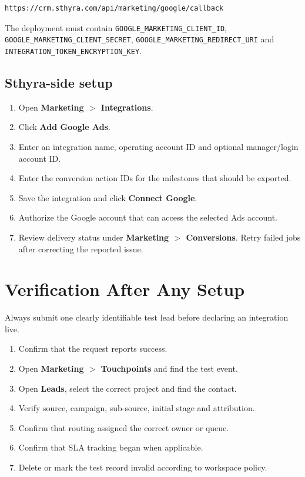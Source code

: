 \documentclass[11pt,a4paper]{article}
\newcommand{\menu}[1]{\textbf{#1}}
\newcommand{\code}[1]{\texttt{#1}}
\begin{document}
\begin{lstlisting}
https://crm.sthyra.com/api/marketing/google/callback
\end{lstlisting}

The deployment must contain \code{GOOGLE\_MARKETING\_CLIENT\_ID}, \code{GOOGLE\_MARKETING\_CLIENT\_SECRET}, \code{GOOGLE\_MARKETING\_REDIRECT\_URI} and \code{INTEGRATION\_TOKEN\_ENCRYPTION\_KEY}.

\subsection{Sthyra-side setup}

\begin{enumerate}
  \item Open \menu{Marketing $>$ Integrations}.
  \item Click \menu{Add Google Ads}.
  \item Enter an integration name, operating account ID and optional manager/login account ID.
  \item Enter the conversion action IDs for the milestones that should be exported.
  \item Save the integration and click \menu{Connect Google}.
  \item Authorize the Google account that can access the selected Ads account.
  \item Review delivery status under \menu{Marketing $>$ Conversions}. Retry failed jobs after correcting the reported issue.
\end{enumerate}

\section{Verification After Any Setup}

Always submit one clearly identifiable test lead before declaring an integration live.

\begin{enumerate}
  \item Confirm that the request reports success.
  \item Open \menu{Marketing $>$ Touchpoints} and find the test event.
  \item Open \menu{Leads}, select the correct project and find the contact.
  \item Verify source, campaign, sub-source, initial stage and attribution.
  \item Confirm that routing assigned the correct owner or queue.
  \item Confirm that SLA tracking began when applicable.
  \item Delete or mark the test record invalid according to workspace policy.
\end{enumerate}
\end{document}
